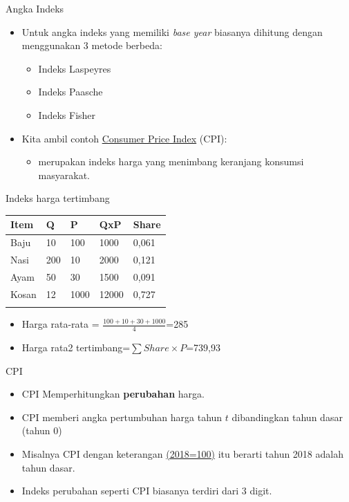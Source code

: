\documentclass[
  ignorenonframetext,
]{beamer}
\providecommand{\tightlist}{%
  \setlength{\itemsep}{0pt}\setlength{\parskip}{0pt}}\usepackage{longtable,booktabs,array}
\begin{document}
\begin{frame}{Angka Indeks}
\label{angka-indeks-1}
\begin{itemize}
\item
  Untuk angka indeks yang memiliki \emph{base year} biasanya dihitung
  dengan menggunakan 3 metode berbeda:

  \begin{itemize}
  \item
    Indeks Laspeyres
  \item
    Indeks Paasche
  \item
    Indeks Fisher
  \end{itemize}
\item
  Kita ambil contoh
  \href{https://www.bps.go.id/id/statistics-table/2/MTcwOSMy/indeks-harga-konsumen-90-kota--umum-.html}{Consumer
  Price Index} (CPI):

  \begin{itemize}
  \tightlist
  \item
    merupakan indeks harga yang menimbang keranjang konsumsi masyarakat.
  \end{itemize}
\end{itemize}
\end{frame}

\begin{frame}{Indeks harga tertimbang}
\label{indeks-harga-tertimbang}
\begin{longtable}[]{@{}lllll@{}}
\toprule\noalign{}
Item & Q & P & QxP & Share \\
\midrule\noalign{}
\endhead
Baju & 10 & 100 & 1000 & 0,061 \\
Nasi & 200 & 10 & 2000 & 0,121 \\
Ayam & 50 & 30 & 1500 & 0,091 \\
Kosan & 12 & 1000 & 12000 & 0,727 \\
\bottomrule\noalign{}
\end{longtable}

\begin{itemize}
\item
  Harga rata-rata = \(\frac{100+10+30+1000}{4}\)=285
\item
  Harga rata2 tertimbang=\(\sum Share \times P\)=739,93
\end{itemize}
\end{frame}

\begin{frame}{CPI}
\label{cpi}
\begin{itemize}
\item
  CPI Memperhitungkan \textbf{perubahan} harga.
\item
  CPI memberi angka pertumbuhan harga tahun \(t\) dibandingkan tahun
  dasar (tahun 0)
\item
  Misalnya CPI dengan keterangan
  \href{https://www.bps.go.id/id/statistics-table/2/MTcwOSMy/indeks-harga-konsumen-90-kota--umum-.html}{(2018=100)}
  itu berarti tahun 2018 adalah tahun dasar.
\item
  Indeks perubahan seperti CPI biasanya terdiri dari 3 digit.
\end{itemize}
\end{frame}
\end{document}
